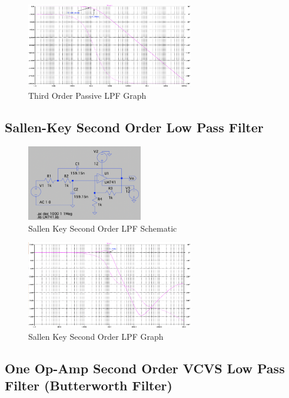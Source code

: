 \documentclass[CMPE]{KGCOEReport}
\begin{document}
\begin{figure}[H]
	\centering
  	\includegraphics[width=0.65\textwidth]{Screenshots/q4_third_order_graph}  
	\caption{Third Order Passive LPF Graph}
	\label{q4_graph_3}
\end{figure}

\subsection*{Sallen-Key Second Order Low Pass Filter}

\begin{figure}[H]
	\centering
  	\includegraphics[width=0.45\textwidth]{Screenshots/q5_schematic}  
	\caption{Sallen Key Second Order LPF Schematic}
	\label{q5_schematic}
\end{figure}

\begin{figure}[H]
	\centering
  	\includegraphics[width=0.65\textwidth]{Screenshots/q5_graph}  
	\caption{Sallen Key Second Order LPF Graph}
	\label{q5_graph}
\end{figure}

\subsection*{One Op-Amp Second Order VCVS Low Pass Filter (Butterworth Filter)}
\end{document}
